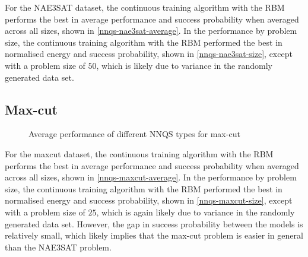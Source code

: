 For the NAE3SAT dataset, the continuous training algorithm with the RBM performs the best in average performance and success probability when averaged across all sizes, shown in \autoref{nnqs-nae3sat-average}. In the performance by problem size, the continuous training algorithm with the RBM performed the best in normalised energy and success probability, shown in \autoref{nnqs-nae3sat-size}, except with a problem size of $50$, which is likely due to variance in the randomly generated data set. 

\subsection{Max-cut}

\begin{figure}[!htb]
    \centering
    \hfill
    \caption{Average performance of different NNQS types for max-cut}
    \label{nnqs-maxcut-average}
\end{figure}

For the maxcut dataset, the continuous training algorithm with the RBM performs the best in average performance and success probability when averaged across all sizes, shown in \autoref{nnqs-maxcut-average}. In the performance by problem size, the continuous training algorithm with the RBM performed the best in normalised energy and success probability, shown in \autoref{nnqs-maxcut-size}, except with a problem size of $25$, which is again likely due to variance in the randomly generated data set. However, the gap in success probability between the models is relatively small, which likely implies that the max-cut problem is easier in general than the NAE3SAT problem.


